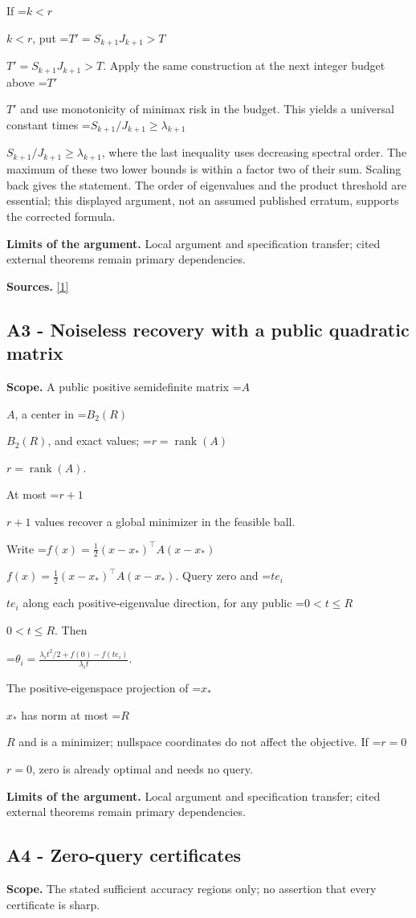 \documentclass[10pt,a4paper]{article}
\newcommand{\AtlasMath}[1]{\par\begingroup\centering\setbox0=\hbox{$\displaystyle #1$}\ifdim\wd0>1.4\linewidth\typeout{ATLAS WIDE FORMULA: \the\wd0}\fi\ifdim\wd0>\linewidth\resizebox{\linewidth}{!}{\box0}\else\box0\fi\par\endgroup}
\newcommand{\AtlasInlineMath}[1]{\begingroup\setbox0=\hbox{$#1$}\ifdim\wd0>.4\linewidth\endgroup\AtlasMath{#1}\else\endgroup$#1$\fi}
\begin{document}
If \AtlasInlineMath{k<r}, put \AtlasInlineMath{T'=S_{k+1}J_{k+1}>T}. Apply the same construction at the next integer budget above \AtlasInlineMath{T'} and use monotonicity of minimax risk in the budget. This yields a universal constant times \AtlasInlineMath{S_{k+1}/J_{k+1}\ge\lambda_{k+1}}, where the last inequality uses decreasing spectral order. The maximum of these two lower bounds is within a factor two of their sum. Scaling back gives the statement. The order of eigenvalues and the product threshold are essential; this displayed argument, not an assumed published erratum, supports the corrected formula.

\textbf{Limits of the argument.} Local argument and specification transfer; cited external theorems remain primary dependencies.

\textbf{Sources.} \href{https://proceedings.neurips.cc/paper_files/paper/2023/file/6e60a9023d2c63f7f0856910129ae753-Paper-Conference.pdf}{[1]}

\subsection{A3 - Noiseless recovery with a public quadratic matrix}
\textbf{Scope.} A public positive semidefinite matrix \AtlasInlineMath{A}, a center in \AtlasInlineMath{B_2(R)}, and exact values; \AtlasInlineMath{r=\operatorname{rank}(A)}.

At most \AtlasInlineMath{r+1} values recover a global minimizer in the feasible ball.

Write \AtlasInlineMath{f(x)=\tfrac12(x-x_*)^\top A(x-x_*)}. Query zero and \AtlasInlineMath{te_i} along each positive-eigenvalue direction, for any public \AtlasInlineMath{0<t\le R}. Then

\AtlasMath{\theta_i=\frac{\lambda_it^2/2+f(0)-f(te_i)}{\lambda_it}.}

The positive-eigenspace projection of \AtlasInlineMath{x_*} has norm at most \AtlasInlineMath{R} and is a minimizer; nullspace coordinates do not affect the objective. If \AtlasInlineMath{r=0}, zero is already optimal and needs no query.

\textbf{Limits of the argument.} Local argument and specification transfer; cited external theorems remain primary dependencies.

\subsection{A4 - Zero-query certificates}
\textbf{Scope.} The stated sufficient accuracy regions only; no assertion that every certificate is sharp.
\end{document}
